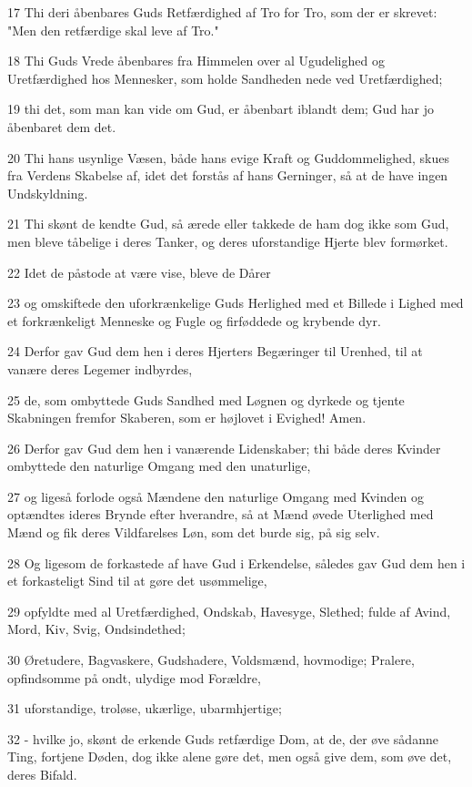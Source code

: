 \par 17 Thi deri åbenbares Guds Retfærdighed af Tro for Tro, som der er skrevet: "Men den retfærdige skal leve af Tro."
\par 18 Thi Guds Vrede åbenbares fra Himmelen over al Ugudelighed og Uretfærdighed hos Mennesker, som holde Sandheden nede ved Uretfærdighed;
\par 19 thi det, som man kan vide om Gud, er åbenbart iblandt dem; Gud har jo åbenbaret dem det.
\par 20 Thi hans usynlige Væsen, både hans evige Kraft og Guddommelighed, skues fra Verdens Skabelse af, idet det forstås af hans Gerninger, så at de have ingen Undskyldning.
\par 21 Thi skønt de kendte Gud, så ærede eller takkede de ham dog ikke som Gud, men bleve tåbelige i deres Tanker, og deres uforstandige Hjerte blev formørket.
\par 22 Idet de påstode at være vise, bleve de Dårer
\par 23 og omskiftede den uforkrænkelige Guds Herlighed med et Billede i Lighed med et forkrænkeligt Menneske og Fugle og firføddede og krybende dyr.
\par 24 Derfor gav Gud dem hen i deres Hjerters Begæringer til Urenhed, til at vanære deres Legemer indbyrdes,
\par 25 de, som ombyttede Guds Sandhed med Løgnen og dyrkede og tjente Skabningen fremfor Skaberen, som er højlovet i Evighed! Amen.
\par 26 Derfor gav Gud dem hen i vanærende Lidenskaber; thi både deres Kvinder ombyttede den naturlige Omgang med den unaturlige,
\par 27 og ligeså forlode også Mændene den naturlige Omgang med Kvinden og optændtes ideres Brynde efter hverandre, så at Mænd øvede Uterlighed med Mænd og fik deres Vildfarelses Løn, som det burde sig, på sig selv.
\par 28 Og ligesom de forkastede af have Gud i Erkendelse, således gav Gud dem hen i et forkasteligt Sind til at gøre det usømmelige,
\par 29 opfyldte med al Uretfærdighed, Ondskab, Havesyge, Slethed; fulde af Avind, Mord, Kiv, Svig, Ondsindethed;
\par 30 Øretudere, Bagvaskere, Gudshadere, Voldsmænd, hovmodige; Pralere, opfindsomme på ondt, ulydige mod Forældre,
\par 31 uforstandige, troløse, ukærlige, ubarmhjertige;
\par 32 - hvilke jo, skønt de erkende Guds retfærdige Dom, at de, der øve sådanne Ting, fortjene Døden, dog ikke alene gøre det, men også give dem, som øve det, deres Bifald.

